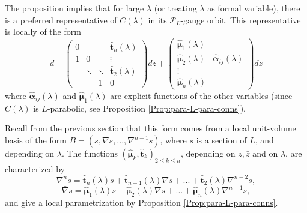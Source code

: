 \documentclass[11pt]{amsart}
\numberwithin{thm}{section} %
\numberwithin{equation}{section} %
\numberwithin{figure}{section} %
\renewcommand*{\l}{\lambda}
\begin{document}
The proposition implies that for large $\l$ (or treating $\l$ as formal variable), there is a preferred representative of $C(\l)$ in its $\mathcal{P}_L$-gauge orbit. This representative is locally of the form
\begin{equation}\label{paragauge}
d+\left(\begin{array}{cccc}
	 0& & & \bm\hat{t}_n(\l) \\
	1& 0& & \vdots \\
	 & \ddots &\ddots & \bm\hat{t}_2(\l) \\
	 & & 1& 0 
\end{array}\right)
dz + \left(\begin{array}{cc}
	 \bm\hat{\mu}_1(\l) &  \\
	 \bm\hat{\mu}_2(\l)&    \bm\hat{\alpha}_{ij}(\l)\\
	 \vdots &  \\
	 \bm\hat{\mu}_n(\l) & 
\end{array}\right) d\bar{z}
\end{equation}
where $\bm\hat{\alpha}_{ij}(\l)$ and $\bm\hat{\mu}_1(\l)$ are explicit functions of the other variables (since $C(\l)$ is $L$-parabolic, see Proposition \ref{Prop:para-L-para-conns}). 

Recall from the previous section that this form comes from a local unit-volume basis of the form $B=(s,\nabla s,...,\nabla^{n-1}s)$, where $s$ is a section of $L$, and depending on $\l$. The functions $(\bm\hat{\mu}_k,\bm\hat{t}_k)_{2\leq k\leq n}$, depending on $z, \bar{z}$ and on $\l$, are characterized by
\begin{equation}\label{paraboliccoord1}
\nabla^n s = \bm\hat{t}_{n}(\l)s + \bm\hat{t}_{n-1}(\l) \nabla s+...+\bm\hat{t}_{2}(\l)\nabla^{n-2}s ,
\end{equation}
\begin{equation}\label{paraboliccoord2}
\bar{\nabla}s = \bm\hat{\mu}_1(\l) s + \bm\hat{\mu}_2(\l) \nabla s + ... + \bm\hat{\mu}_n(\l) \nabla^{n-1}s,
\end{equation}
and give a local parametrization by Proposition \ref{Prop:para-L-para-conns}.

\end{document}
